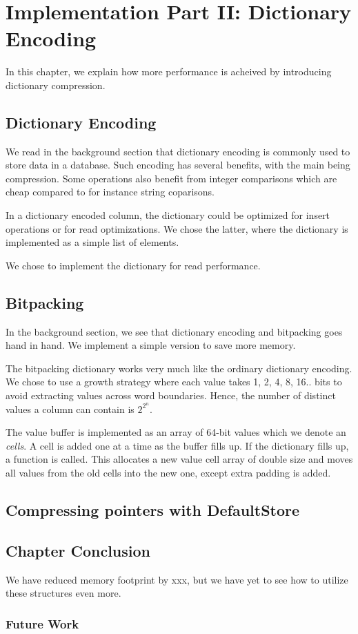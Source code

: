 \chapter{Implementation Part II: Dictionary Encoding}
\label{chap:part3}
In this chapter, we explain how more performance is acheived by introducing dictionary compression.

\section{Dictionary Encoding}
\label{sec:Dictionary Encoding}
We read in the background section that dictionary encoding is commonly used to store data in a database. Such encoding has several benefits, with the main being compression. Some operations also benefit from integer comparisons which are cheap compared to for instance string coparisons.

In a dictionary encoded column, the dictionary could be optimized for insert operations or for read optimizations. We chose the latter, where the dictionary is implemented as a simple list of elements.


We chose to implement the dictionary for read performance.


\section{Bitpacking}
\label{sec:Bitpacking}
In the background section, we see that dictionary encoding and bitpacking goes hand in hand. We implement a simple version to save more memory. 

The bitpacking dictionary works very much like the ordinary dictionary encoding. We chose to use a growth strategy where each value takes 1, 2, 4, 8, 16.. bits to avoid extracting values across word boundaries. Hence, the number of distinct values a column can contain is $2^{2^n}$.

The value buffer is implemented as an array of 64-bit values which we denote an \textit{cells}. A cell is added one at a time as the buffer fills up. If the dictionary fills up, a  function is called. This allocates a new value cell array of double size and moves all values from the old cells into the new one, except extra padding is added.


\section{Compressing pointers with DefaultStore}
\label{sec:Compressing pointers with DefaultStore}


\section{Chapter Conclusion}
\label{sec:Chapter Conclusion}
We have reduced memory footprint by xxx, but we have yet to see how to utilize these structures even more.

\subsection{Future Work}
\label{sub:Future Work}
